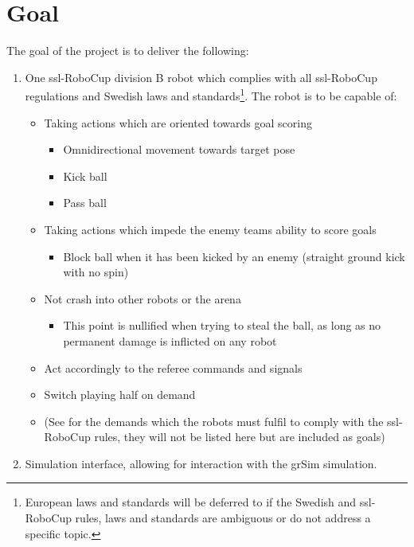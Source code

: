 \section{Goal}
\label{section:goal}

The goal of the project is to deliver the following:
\begin{enumerate}
    \item One \ac{ssl}-RoboCup division B robot which complies with all \ac{ssl}-RoboCup regulations and Swedish laws and standards\footnote{European laws and standards will be deferred to if the Swedish and \ac{ssl}-RoboCup rules, laws and standards are ambiguous or do not address a specific topic.}. The robot is to be capable of:
    \begin{itemize}
        \item Taking actions which are oriented towards goal scoring
        \begin{itemize}
            \item Omnidirectional movement towards target pose
            \item Kick ball
            \item Pass ball
        \end{itemize}
        \item Taking actions which impede the enemy teams ability to score goals
        \begin{itemize}
            \item Block ball when it has been kicked by an enemy (straight ground kick with no spin)
        \end{itemize}
        \item Not crash into other robots or the arena
        \begin{itemize}
            \item This point is nullified when trying to steal the ball, as long as no permanent damage is inflicted on any robot
        \end{itemize}
        \item Act accordingly to the referee commands and signals
        \item Switch playing half on demand
        \item (See\:\cite{noauthor_rules_2024} for the demands which the robots must fulfil to comply with the \ac{ssl}-RoboCup rules, they will not be listed here but are included as goals)
    \end{itemize}
    \item Simulation interface, allowing for interaction with the grSim simulation.

\end{enumerate}
